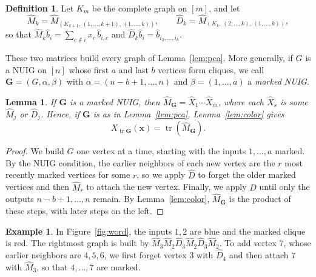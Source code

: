 \documentclass[12pt]{article}
\theoremstyle{plain}
\newtheorem{lemma}[theorem]{Lemma}
\theoremstyle{definition}
\newtheorem{definition}[theorem]{Definition}
\newtheorem{example}[theorem]{Example}
\theoremstyle{remark}
\newcommand{\bG}{\mathbf{G}}
\begin{document}
\begin{definition}
Let $K_m$ be the complete graph on $[m]$, and let
\[
\hat M_k=\hat M_{(K_{k+1},\,(1,\dots,k+1),\,(1,\dots,k))},\qquad \hat D_k=\hat M_{(K_k,\,(2,\dots,k),\,(1,\dots,k))},
\]
so that $\hat M_k\hat b_i=\sum_{c\notin i}x_c\,\hat b_{i,c}$ and $\hat D_k\hat b_i=\hat b_{i_2,\dots,i_k}$.
\end{definition}
These two matrices build every graph of Lemma~\ref{lem:pca}. More generally, if $G$ is a NUIG on $[n]$ whose first $a$ and last $b$ vertices form cliques, we call $\bG=(G,\alpha,\beta)$ with $\alpha=(n-b+1,\dots,n)$ and $\beta=(1,\dots,a)$ a \emph{marked NUIG}.

\begin{lemma}\label{lem:word}
If $\bG$ is a marked NUIG, then $\hat M_\bG=\hat X_1\cdots\hat X_m$, where each $\hat X_s$ is some $\hat M_j$ or $\hat D_j$. Hence, if $\bG$ is as in Lemma~\ref{lem:pca}, Lemma~\ref{lem:color} gives
\begin{equation}\label{eq:pcatrace}
X_{\operatorname{tr}\bG}(\bm x)=\operatorname{tr}(\hat{M}_{\bG}).
\end{equation}
\end{lemma}

\begin{proof}
We build $G$ one vertex at a time, starting with the inputs $1,\dots,a$ marked. By the NUIG condition, the earlier neighbors of each new vertex are the $r$ most recently marked vertices for some $r$, so we apply $\hat D$ to forget the older marked vertices and then $\hat M_r$ to attach the new vertex. Finally, we apply $\hat D$ until only the outputs $n-b+1,\dots,n$ remain. By Lemma~\ref{lem:color}, $\hat M_\bG$ is the product of these steps, with later steps on the left.
\end{proof}

\begin{example}\label{ex:word}
In Figure~\ref{fig:word}, the inputs $1,2$ are blue and the marked clique is red. The rightmost graph is built by $\hat M_3\hat M_2\hat D_3\hat M_2\hat D_3\hat M_2$. To add vertex $7$, whose earlier neighbors are $4,5,6$, we first forget vertex $3$ with $\hat D_4$ and then attach $7$ with $\hat M_3$, so that $4,\dots,7$ are marked.
\end{example}
\end{document}
